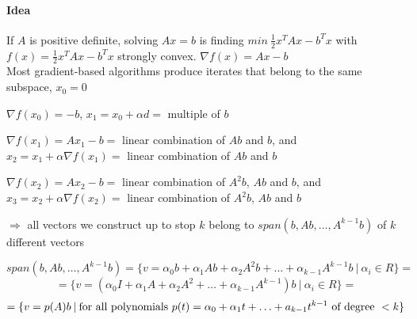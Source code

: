 \documentclass[10pt]{report}
\begin{document}
\paragraph{Idea} If $A$ is positive definite, solving $Ax=b$ is finding $min\:\frac{1}{2}x^TAx - b^Tx$ with $f(x) = \frac{1}{2}x^TAx - b^Tx$ strongly convex. $\nabla f(x) = Ax-b$\\Most gradient-based algorithms produce iterates that belong to the same subspace, $x_0 = 0$\begin{list}{}{}
	\item $\nabla f(x_0) = -b$, $x_1 = x_0+\alpha d=$ multiple of $b$
	\item $\nabla f(x_1) = Ax_1-b=$ linear combination of $Ab$ and $b$, and $x_2=x_1+\alpha\nabla f(x_1) =$ linear combination of $Ab$ and $b$
	\item $\nabla f(x_2) = Ax_2-b=$ linear combination of $A^2b$, $Ab$ and $b$, and $x_3=x_2+\alpha\nabla f(x_2) =$ linear combination of $A^2b$, $Ab$ and $b$
	\item[$\Rightarrow$] all vectors we construct up to stop $k$ belong to $span(b,Ab,\ldots,A^{k-1}b)$ of $k$ different vectors
\end{list}
$$span(b,Ab,\ldots,A^{k-1}b) = \{v=\alpha_0b+\alpha_1Ab+\alpha_2A^2b+\ldots+\alpha_{k-1}A^{k-1}b\:|\:\alpha_i\in R\}=$$
$$=\{v = (\alpha_0I+\alpha_1A+\alpha_2A^2+\ldots+\alpha_{k-1}A^{k-1})b\:|\:\alpha_i\in R\} = $$
$$ = \{v=p(A)b\:|\:\hbox{for all polynomials }p(t)=\alpha_0+\alpha_1t+\ldots+a_{k-1}t^{k-1}\hbox{ of degree }<k\}$$
\end{document}
